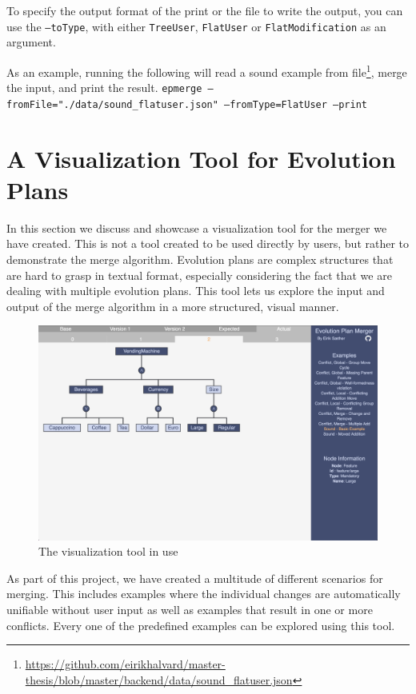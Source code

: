 \documentclass[a4paper,english]{ifimaster}
\begin{document}
To specify the output format of the print or the file to write the output, you can use the \texttt{--toType}, with either \texttt{TreeUser}, \texttt{FlatUser} or \texttt{FlatModification} as an argument.

As an example, running the following will read a sound example from file\footnote{\url{https://github.com/eirikhalvard/master-thesis/blob/master/backend/data/sound\_flatuser.json}}, merge the input, and print the result. \texttt{epmerge --fromFile="./data/sound\_flatuser.json" --fromType=FlatUser --print}

\section{A Visualization Tool for Evolution Plans}%
\label{sec:a_visualization_tool_for_evolution_plans}

In this section we discuss and showcase a visualization tool for the merger we have created. This is not a tool created to be used directly by users, but rather to demonstrate the merge algorithm. Evolution plans are complex structures that are hard to grasp in textual format, especially considering the fact that we are dealing with multiple evolution plans. This tool lets us explore the input and output of the merge algorithm in a more structured, visual manner.

\begin{figure}[htpb]
  \centering
  \includegraphics[width=\linewidth]{vending_machine/sound_example.png}
  \caption{The visualization tool in use}%
  \label{fig:visualization_tool_in_use}
\end{figure}

As part of this project, we have created a multitude of different scenarios for merging. This includes examples where the individual changes are automatically unifiable without user input as well as examples that result in one or more conflicts. Every one of the predefined examples can be explored using this tool. 
\end{document}
